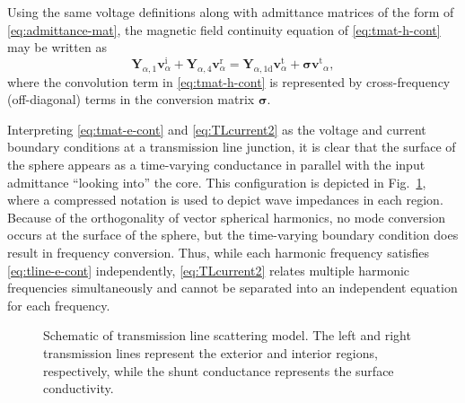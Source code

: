 \documentclass[article]{IEEEtran}
\newcommand{\M}[1]{\mathbf{#1}}
\newcommand{\T}[1]{\mathrm{#1}}
\newcommand{\V}[1]{\boldsymbol{#1}}
\begin{document}
Using the same voltage definitions along with admittance matrices of the form of \eqref{eq:admittance-mat}, the magnetic field  continuity equation of \eqref{eq:tmat-h-cont} may be written as
\begin{equation}\label{eq:TLcurrent2}
    \M{Y}_{\alpha,1} \M{v}^\T{i}_\alpha   + \M{Y}_{\alpha,4} \M{v}^\T{r}_\alpha  =  \M{Y}_{\alpha,1\T{d}}\M{v}^\T{t}_\alpha + \V{\sigma}\M{v^\T{t}}_\alpha,
\end{equation}
where the convolution term in \eqref{eq:tmat-h-cont} is represented by cross-frequency (off-diagonal) terms in the conversion matrix $\V{\sigma}$.

Interpreting \eqref{eq:tmat-e-cont} and \eqref{eq:TLcurrent2} as the voltage and current boundary conditions at a transmission line junction, it is clear that the surface of the sphere appears as a time-varying conductance in parallel with the input admittance ``looking into'' the core.  This configuration is depicted in Fig.~\ref{fig:TLschematic}, where a compressed notation is used to depict wave impedances in each region.  Because of the orthogonality of vector spherical harmonics, no mode conversion occurs at the surface of the sphere, but the time-varying boundary condition does result in frequency conversion. Thus, while each harmonic frequency satisfies \eqref{eq:tline-e-cont} independently, \eqref{eq:TLcurrent2} relates multiple harmonic frequencies simultaneously and cannot be separated into an independent equation for each frequency.

\begin{figure}
    \centering
    
    \caption{Schematic of transmission line scattering model.  The left and right transmission lines represent the exterior and interior regions, respectively, while the shunt conductance represents the surface conductivity.}
    \label{fig:TLschematic}
\end{figure}
\end{document}
